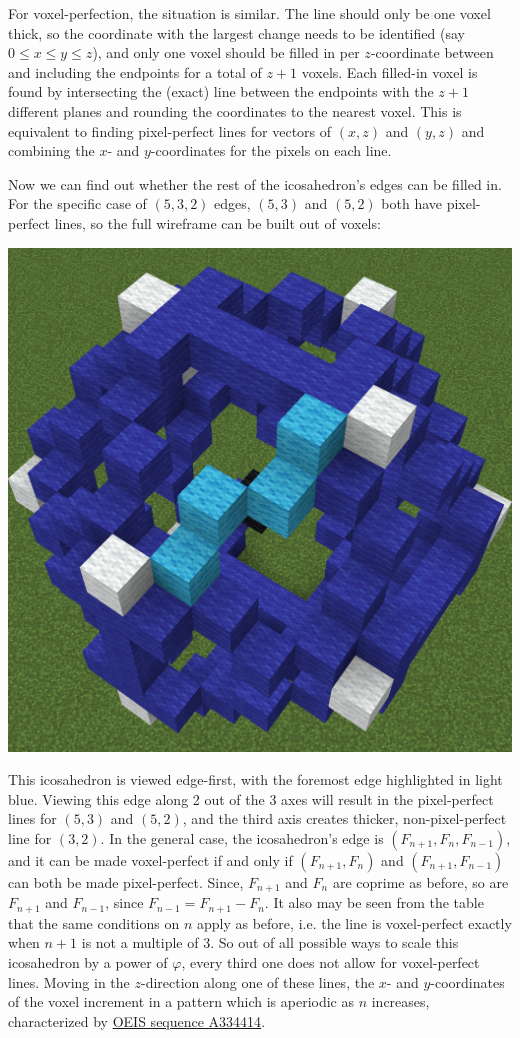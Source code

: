 \documentclass{article}
\begin{document}
For voxel-perfection, the situation is similar.
The line should only be one voxel thick,
so the coordinate with the largest change needs to be identified
(say $0 \leq x \leq y \leq z$),
and only one voxel should be filled in 
per $z$-coordinate between and including the endpoints
for a total of $z+1$ voxels.
Each filled-in voxel is found by intersecting the (exact) line between the endpoints
with the $z+1$ different planes and rounding the coordinates to the nearest voxel.
This is equivalent to finding pixel-perfect lines for vectors of $(x, z)$ and $(y, z)$
and combining the $x$- and $y$-coordinates for the pixels on each line.

Now we can find out whether the rest of the icosahedron's edges can be filled in.
For the specific case of $(5, 3, 2)$ edges,
$(5, 3)$ and $(5, 2)$ both have pixel-perfect lines,
so the full wireframe can be built out of voxels:

\begin{center}
\includegraphics[width=0.25\linewidth]{ike2.png}
\end{center}

This icosahedron is viewed edge-first, with the foremost edge highlighted in light blue.
Viewing this edge along 2 out of the 3 axes will result in
the pixel-perfect lines for $(5, 3)$ and $(5, 2)$,
and the third axis creates thicker, non-pixel-perfect line for $(3, 2)$.
In the general case, the icosahedron's edge is $(F_{n+1}, F_n, F_{n-1})$,
and it can be made voxel-perfect if and only if
$(F_{n+1}, F_n)$ and $(F_{n+1}, F_{n-1})$ can both be made pixel-perfect.
Since, $F_{n+1}$ and $F_n$ are coprime as before,
so are $F_{n+1}$ and $F_{n-1}$, since $F_{n-1}=F_{n+1}-F_n$.
It also may be seen from the table that the same conditions on $n$ apply as before,
i.e. the line is voxel-perfect exactly when $n+1$ is not a multiple of 3.
So out of all possible ways to scale this icosahedron by a power of $\varphi$,
every third one does not allow for voxel-perfect lines.
Moving in the $z$-direction along one of these lines,
the $x$- and $y$-coordinates of the voxel increment in a pattern
which is aperiodic as $n$ increases,
characterized by
\href{https://oeis.org/A334414}{OEIS sequence A334414}.
\end{document}

